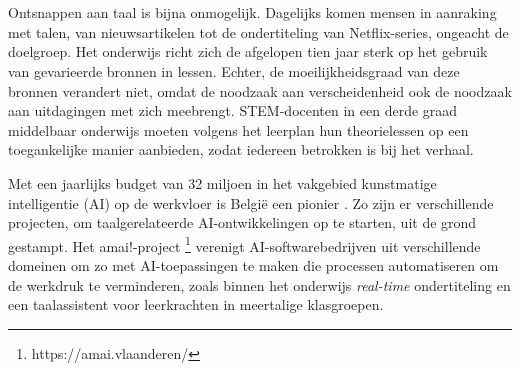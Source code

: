 
\chapter{}%
\label{ch:inleiding}



Ontsnappen aan taal is bijna onmogelijk. Dagelijks komen mensen in aanraking met talen, van nieuwsartikelen tot de ondertiteling van Netflix-series, ongeacht de doelgroep. Het onderwijs richt zich de afgelopen tien jaar sterk op het gebruik van gevarieerde bronnen in lessen. Echter, de moeilijkheidsgraad van deze bronnen verandert niet, omdat de noodzaak aan verscheidenheid ook de noodzaak aan uitdagingen met zich meebrengt. STEM-docenten in een derde graad middelbaar onderwijs moeten volgens het leerplan hun theorielessen op een toegankelijke manier aanbieden, zodat iedereen betrokken is bij het verhaal.

Met een jaarlijks budget van 32 miljoen in het vakgebied kunstmatige intelligentie (AI) op de werkvloer is België een pionier \autocite{Crevits2022}.  Zo zijn er verschillende projecten, om taalgerelateerde AI-ontwikkelingen op te starten, uit de grond gestampt. Het amai!-project \footnote{https://amai.vlaanderen/}  verenigt AI-softwarebedrijven uit verschillende domeinen om zo met AI-toepassingen te maken die processen automatiseren om de werkdruk te verminderen, zoals binnen het onderwijs \textit{real-time} ondertiteling en een taalassistent voor leerkrachten in meertalige klasgroepen.

